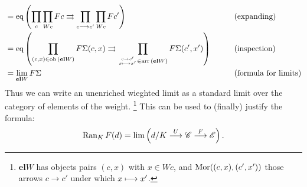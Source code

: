 \documentclass[11pt]{article}
\begin{document}
\begin{itemise}
\begin{alignat*}{2}
&=
\textup{eq} \left(\prod_{c}\prod_{Wc}Fc \rightrightarrows \prod_{c\to c'}\prod_{Wc}Fc'\right)%
&\qquad&\text{(expanding)}\\
&=
\textup{eq} \left(\prod_{(c,x)\in\ob(\textbf{el}W)} F\Sigma(c,x) \rightrightarrows \prod_{{{c\rightarrow c'}\atop{x\shortmapsto x'}}\in \arr(\textbf{el}W)}F\Sigma(c',x') \right)%
&\qquad&\text{(inspection)}\\
&=
\limit_{\textbf{el}W}F\Sigma%
&\qquad&\text{(formula for limits)}
\end{alignat*}
Thus we can write an unenriched wieghted limit as a standard limit over the category of elements of the weight.%
\footnote{$\textbf{el}W$ has objects pairs $(c,x)$ with $x\in Wc$, and $\operatorname{Mor}((c,x),(c',x'))$ those arrows $c\rightarrow c'$ under which $x\shortmapsto x'$.} This can be used to (finally) justify the formula:
\[\operatorname{Ran}_KF(d)=\lim\left(d/K\overset{U}{\longrightarrow}\mathscr{C}\overset{F}{\longrightarrow}\mathscr{E}\right).\]
\end{itemise}
\end{document}

